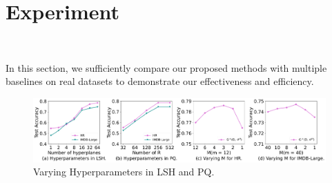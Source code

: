 
\section{Experiment}~\label{sec:exp}


In this section, we sufficiently compare our proposed methods with multiple baselines on real datasets to demonstrate our effectiveness and efficiency. 















\begin{figure}
	\centering
	\includegraphics[width=1\textwidth]{figs/M}
	\caption{Varying Hyperparameters in LSH and PQ.}
	\label{fig:pq-exp}
\end{figure}



